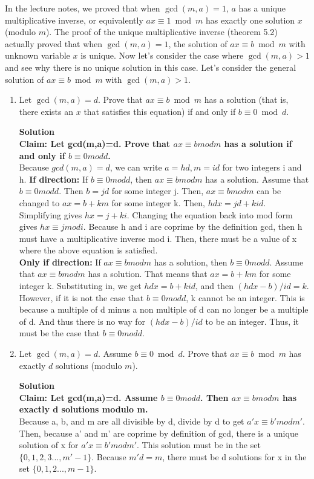 \documentclass[11pt]{article}
\newenvironment{Parts}{\begin{enumerate}[label=(\alph*)]}{\end{enumerate}}
\newcommand*{\Part}{\item}
\begin{document}
In the lecture notes, we proved that when $\gcd(m, a) = 1$, $a$ has a unique multiplicative inverse, or equivalently $ax \equiv 1\bmod m$ has exactly one solution $x$ (modulo $m$). The proof of the unique multiplicative inverse (theorem 5.2) actually proved that when $\gcd(m, a) = 1$, the solution of $ax \equiv b\bmod m$ with unknown variable $x$ is unique. Now let's consider the case where $\gcd(m, a)>1$ and see why there is no unique solution in this case. Let's consider the general solution of $ax \equiv b\bmod m$ with $\gcd(m, a)>1$.
\begin{Parts}
  
  \Part Let $\gcd(m, a) = d$. Prove that $ax \equiv b\bmod m$ has a solution (that is, there exists an $x$ that satisfies this equation) if and only if $b\equiv0\bmod d$.
  \begin{mdframed} \textbf{Solution} \\
\textbf{Claim: Let gcd(m,a)=d. Prove that $ax \equiv bmodm$ has a solution if and only if $b \equiv 0modd$.} \\
Because $gcd(m,a)=d$, we can write $a=hd, m=id$ for two integers i and h. 
\textbf{If direction: }If $b \equiv 0modd$, then $ax \equiv bmodm$ has a solution. Assume that $b \equiv 0modd$. Then $b=jd$ for some integer j. Then, $ax \equiv bmodm$ can be changed to $ax=b+km$ for some integer k. Then, $hdx=jd+kid$. Simplifying gives $hx=j+ki$. Changing the equation back into mod form gives $hx \equiv jmodi$. Because h and i are coprime by the definition gcd, then h must have a multiplicative inverse mod i. Then, there must be a value of x where the above equation is satisfied. \\
\textbf{Only if direction: }If $ax \equiv bmodm$ has a solution, then $b \equiv 0modd$. Assume that $ax \equiv bmodm$ has a solution. That means that $ax=b+km$ for some integer k. Substituting in, we get $hdx=b+kid$, and then $(hdx-b)/id=k$. However, if it is not the case that $b \equiv 0modd$, k cannot be an integer. This is because a multiple of d minus a non multiple of d can no longer be a multiple of d. And thus there is no way for $(hdx-b)/id$ to be an integer. Thus, it must be the case that $b \equiv 0modd$.
\end{mdframed}

  \Part Let $\gcd(m, a) = d$. Assume $b \equiv 0\bmod d$. Prove that $ax \equiv b\bmod m$ has exactly $d$ solutions (modulo $m$).
  \begin{mdframed} \textbf{Solution} \\
\textbf{Claim: Let gcd(m,a)=d. Assume $b \equiv 0modd$. Then $ax \equiv bmodm$ has exactly d solutions modulo m. } \\
Because a, b, and m are all divisible by d, divide by d to get $a'x \equiv b'modm'$. Then, because a' and m' are coprime by definition of gcd, there is a unique solution of x for $a'x \equiv b'modm'$. This solution must be in the set $\{0,1,2,3...,m'-1\}$. Because $m'd=m$, there must be d solutions for x in the set $\{0,1,2...,m-1\}$.
\end{mdframed}


\end{Parts}
\end{document}
